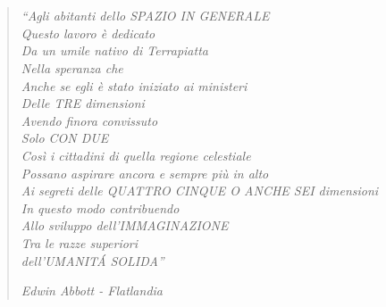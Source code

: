 
	\chapter*{}
		\begin{quote}
			\emph{``Agli abitanti dello SPAZIO IN GENERALE\\
			Questo lavoro è dedicato\\
			Da un umile nativo di Terrapiatta\\
			Nella speranza che\\
			Anche se egli è stato iniziato ai ministeri\\
			Delle TRE dimensioni\\
			Avendo finora convissuto\\
			Solo CON DUE\\
			Così i cittadini di quella regione celestiale\\
			Possano aspirare ancora e sempre più in alto\\
			Ai segreti delle QUATTRO CINQUE O ANCHE SEI dimensioni\\
			In questo modo contribuendo\\
			Allo sviluppo dell'IMMAGINAZIONE\\
			Tra le razze superiori\\
			dell'UMANIT\'A SOLIDA''\\}
		
			\hfill\textit{Edwin Abbott - Flatlandia}						
			
		\end{quote}